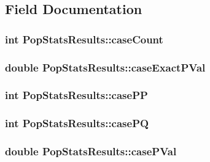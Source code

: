 \subsection{Field Documentation}
\hypertarget{structPopStatsResults_a43f4b5b1fec3ff6347e140f140a56f80}{
\subsubsection[{caseCount}]{\setlength{\rightskip}{0pt plus 5cm}int {\bf PopStatsResults::caseCount}}}
\label{structPopStatsResults_a43f4b5b1fec3ff6347e140f140a56f80}
\hypertarget{structPopStatsResults_ae91841cf9427166ba755ab1350d4698b}{
\subsubsection[{caseExactPVal}]{\setlength{\rightskip}{0pt plus 5cm}double {\bf PopStatsResults::caseExactPVal}}}
\label{structPopStatsResults_ae91841cf9427166ba755ab1350d4698b}
\hypertarget{structPopStatsResults_a47ed24bab69a1b7a65c298cdb1c97117}{
\subsubsection[{casePP}]{\setlength{\rightskip}{0pt plus 5cm}int {\bf PopStatsResults::casePP}}}
\label{structPopStatsResults_a47ed24bab69a1b7a65c298cdb1c97117}
\hypertarget{structPopStatsResults_a60d023691ccf07ffee079b98ebf01338}{
\subsubsection[{casePQ}]{\setlength{\rightskip}{0pt plus 5cm}int {\bf PopStatsResults::casePQ}}}
\label{structPopStatsResults_a60d023691ccf07ffee079b98ebf01338}
\hypertarget{structPopStatsResults_ac352f2bc013bf07a2c5a040c5d00dc93}{
\subsubsection[{casePVal}]{\setlength{\rightskip}{0pt plus 5cm}double {\bf PopStatsResults::casePVal}}}
